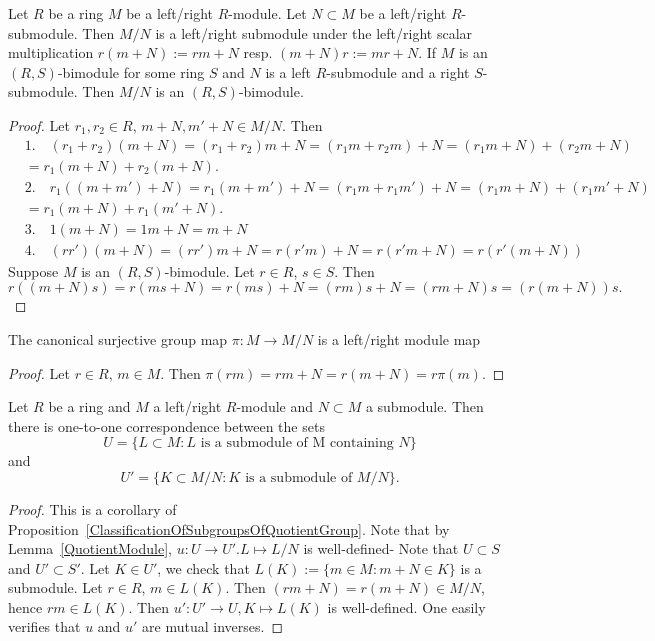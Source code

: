 \begin{lemma}\label{QuotientModule}
    Let $R$ be a ring $M$ be a left/right $R$-module. Let $N\subset M$ be a left/right $R$-submodule. Then $M/N$ is a left/right submodule under the left/right scalar multiplication $r(m+N) := rm+N$ resp. $(m+N)r := mr+N$. If $M$ is an $(R,S)$-bimodule for some ring $S$ and $N$ is a left $R$-submodule and a right $S$-submodule. Then $M/N$ is an $(R,S)$-bimodule.
\end{lemma}
\begin{proof}
    Let $r_1,r_2\in R$, $m+N,m'+N\in M/N$. Then 
    \begin{align*}
        &1. \quad (r_1+r_2)(m+N) = (r_1+r_2)m+N = (r_1m+r_2m)+N =(r_1m+N)+(r_2m+N)\\ &= r_1(m+N) + r_2(m+N).\\
        &2. \quad r_1((m+m')+N)=r_1(m+m')+N = (r_1m+r_1m')+N = (r_1m+N)+(r_1m'+N)\\ &= r_1(m+N)+r_1(m'+N).\\ 
        &3. \quad 1(m+N) = 1m+N = m +N\\
        &4. \quad (rr')(m+N)=(rr')m+N = r(r'm)+N= r(r'm+N)=r(r'(m+N))
    \end{align*}
    Suppose $M$ is an $(R,S)$-bimodule. Let $r\in R$, $s\in S$. Then 
    $$r((m+N)s)=r(ms+N)=r(ms)+N = (rm)s+N = (rm+N)s=(r(m+N))s.$$
\end{proof}
\begin{corollary}
    The canonical surjective group map $\pi : M\rightarrow M/N$ is a left/right module map
\end{corollary}
\begin{proof}
    Let $r\in R$, $m\in M$. Then $\pi(rm)=rm+N=r(m+N)=r\pi(m).$
\end{proof}
\begin{lemma}\label{SubmodulesOfQuotientModule}
    Let $R$ be a ring and $M$ a left/right $R$-module and $N\subset M$ a submodule. Then there is one-to-one correspondence between the sets 
    $$U=\{L\subset M : L \text{ is a submodule of M containing }N \}$$
    and 
    $$U' = \{ K \subset M/N : K \text{ is a submodule of } M/N\}.$$
\end{lemma}
\begin{proof}
     This is a corollary of Proposition~\ref{ClassificationOfSubgroupsOfQuotientGroup}. Note that by Lemma~\ref{QuotientModule}, $u:U\rightarrow U'. L\mapsto L/N$ is well-defined- Note that $U\subset S$ and $U'\subset S'$. Let $K\in U'$, we check that $L(K) := \{m\in M : m+N\in K\}$ is a submodule. Let $r\in R$, $m\in L(K)$. Then $(rm+N)=r(m+N)\in M/N$, hence $rm\in L(K)$. Then $u' : U'\rightarrow U, K\mapsto L(K)$ is well-defined. One easily verifies that $u$ and $u'$ are mutual inverses.   
\end{proof}
